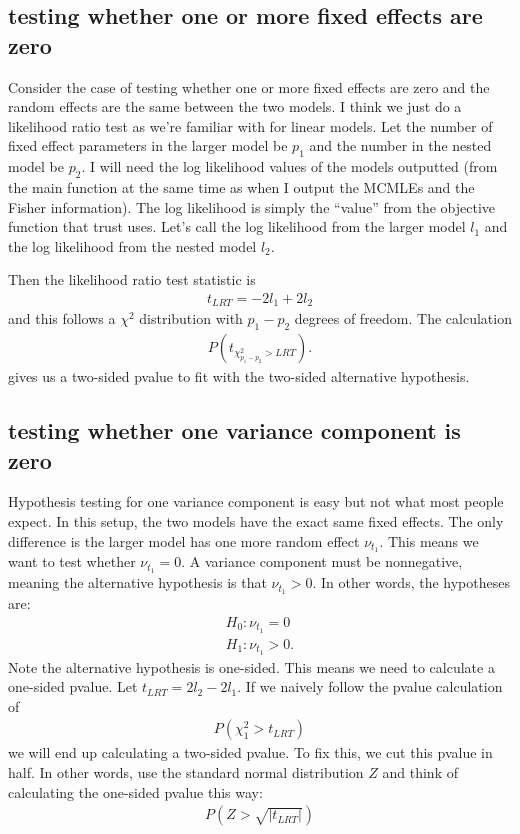\documentclass{article}
\begin{document}
\subsection{testing whether one or more fixed effects are zero}
Consider the  case of testing whether one or more fixed effects are zero and the random effects are the same between the two models. I think we just do a likelihood ratio test as we're familiar with for linear models.   Let the number of fixed effect parameters in the larger model be $p_1$  and the number in the nested model be $p_2$. I will need the log likelihood values of the models outputted (from the main function at the same time as when I output the MCMLEs and the Fisher information). The log likelihood is simply the ``value'' from the objective function that trust uses. Let's call the log likelihood from the larger model  $l_1$ and the log likelihood from the nested model  $l_2$. 

Then the likelihood ratio test statistic is
\begin{align}
t_{LRT}= -2l_1+2l_2
\end{align}
and this follows a $\chi^2$ distribution with $p_1-p_2$ degrees of freedom. The calculation
\begin{align}
P(t_{\chi^2_{p_1-p_2}>LRT} ).
\end{align}
gives us a two-sided pvalue to fit with the two-sided alternative hypothesis.

 
 \subsection{testing whether one variance component is zero}
  Hypothesis testing for one variance component is easy but not what most people expect.
  In this setup, the two models have the exact same fixed effects. The only difference is the larger model has one more random effect $\nu_{t_1}$. This means we want to test whether $\nu_{t_1}=0$. A variance component must be nonnegative, meaning the alternative hypothesis is that $\nu_{t_1}>0$. In other words, the hypotheses are:
 \begin{align}
 H_0: \nu_{t_1}=0\\
 H_1: \nu_{t_1}>0.
 \end{align}
 Note the alternative hypothesis is one-sided. This means we need to calculate a one-sided pvalue. Let $t_{LRT}=2l_2-2l_1$. If we naively follow the pvalue calculation of
 \begin{align}
P( \chi^2_{1}>t_{LRT})
\end{align}
 we will end up calculating a two-sided pvalue. To fix this, we cut this pvalue in half. In other words, use the standard normal distribution $Z$ and think of calculating the one-sided pvalue this way:
 \begin{align}
 P( Z>\sqrt{|  t_{LRT} |})
 \end{align}
 
\end{document}
